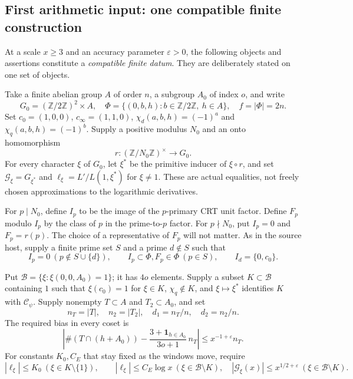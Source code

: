 \subsection{First arithmetic input: one compatible finite construction}

At a scale $x\ge3$ and an accuracy parameter $\varepsilon>0$,
the following objects and assertions constitute a
\emph{compatible finite datum}.  They are deliberately stated on
one set of objects.

Take a finite abelian group $A$ of order $n$, a subgroup $A_0$ of
index $o$, and write
\[
 G_0=(\mathbb Z/2\mathbb Z)^2\times A,\quad
 \Phi=\{(0,b,h):b\in\mathbb Z/2\mathbb Z,\ h\in A\},
 \quad f=|\Phi|=2n.
\]
Set $c_0=(1,0,0)$, $c_\infty=(1,1,0)$,
$\chi_d(a,b,h)=(-1)^a$ and $\chi_q(a,b,h)=(-1)^b$.
Supply a positive modulus $N_0$ and an onto homomorphism
\[
 r:(\mathbb Z/N_0\mathbb Z)^\times\longrightarrow G_0.
\]
For every character $\xi$ of $G_0$, let $\xi^*$ be the primitive
inducer of $\xi\circ r$, and set
$\mathcal G_\xi=G_{\xi^*}$ and
$\ell_\xi=L'/L(1,\xi^*)$ for $\xi\ne1$.
These are actual equalities, not freely chosen approximations to
the logarithmic derivatives.

For $p\mid N_0$, define $I_p$ to be the image of the $p$-primary
CRT unit factor.  Define $F_p$ modulo $I_p$ by the class of $p$
in the prime-to-$p$ factor.  For $p\nmid N_0$, put $I_p=0$ and
$F_p=r(p)$.  The choice of a representative of $F_p$ will not
matter.  As in the source host, supply a finite prime set $S$ and
a prime $d\notin S$ such that
\[
 I_p=0\ (p\notin S\cup\{d\}),\qquad
 I_p\subset\Phi, F_p\in\Phi\ (p\in S),\qquad
 I_d=\{0,c_0\}.                                    \tag{CMP.2}
\]

Put $\mathcal B=\{\xi:\xi(0,0,A_0)=1\}$; it has $4o$
elements.  Supply a subset $K\subset\mathcal B$ containing $1$
such that $\xi(c_0)=1$ for $\xi\in K$, $\chi_q\notin K$, and
$\xi\mapsto\xi^*$ identifies $K$ with
$\mathcal C_\psi$.  Supply nonempty $T\subset A$ and
$T_2\subset A_0$, and set
\[
 n_T=|T|,\quad n_2=|T_2|,\quad d_1=n_T/n,\quad d_2=n_2/n.
\]
The required bias in every coset is
\[
 \left|\#(T\cap(h+A_0))-
       \frac{3+\mathbf1_{h\in A_0}}{3o+1}\,n_T\right|
                   \le x^{-1+\varepsilon}n_T.
 \tag{CMP.3}
\]
For constants $K_0,C_E$ that stay fixed as the windows move,
require
\[
 |\ell_\xi|\le K_0\ (\xi\in K\setminus\{1\}),\qquad
 |\ell_\xi|\le C_E\log x\ (\xi\in\mathcal B\setminus K),
 \quad
 |\mathcal G_\xi(x)|\le x^{1/2+\varepsilon}
                 \ (\xi\in\mathcal B\setminus K).
 \tag{CMP.4}
\]

